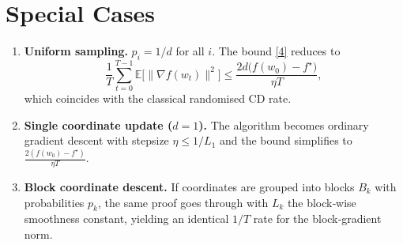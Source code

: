 \documentclass{article}
\newcommand{\E}{\mathbb{E}}
\begin{document}
\section*{Special Cases}
\begin{enumerate}
\item \textbf{Uniform sampling.} $p_{i}=1/d$ for all $i$.
   The bound \eqref{4} reduces to
   \[
   \frac{1}{T}\sum_{t=0}^{T-1}\E\!\bigl[\|\nabla f(w_{t})\|^{2}\bigr]
   \le \frac{2d\bigl(f(w_{0})-f^{\star}\bigr)}{\eta T},
   \]
   which coincides with the classical randomised CD rate.
\item \textbf{Single coordinate update ($d=1$).}
   The algorithm becomes ordinary gradient descent with stepsize
   $\eta\le 1/L_{1}$ and the bound simplifies to
   $\frac{2(f(w_{0})-f^{\star})}{\eta T}$.
\item \textbf{Block coordinate descent.}
   If coordinates are grouped into blocks $B_{k}$ with probabilities $p_{k}$,
   the same proof goes through with $L_{k}$ the block‑wise smoothness constant,
   yielding an identical $1/T$ rate for the block‑gradient norm.
\end{enumerate}
\end{document}

